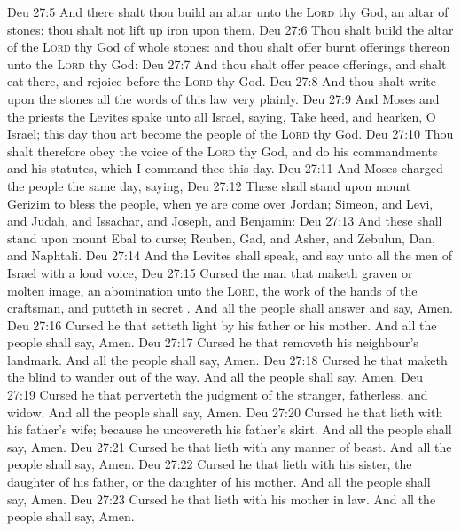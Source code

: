 \vs Deu 27:5 And there shalt thou build an altar unto the \textsc{Lord} thy God, an altar of stones: thou shalt not lift up  iron  upon them.
\vs Deu 27:6 Thou shalt build the altar of the \textsc{Lord} thy God of whole stones: and thou shalt offer burnt offerings thereon unto the \textsc{Lord} thy God:
\vs Deu 27:7 And thou shalt offer peace offerings, and shalt eat there, and rejoice before the \textsc{Lord} thy God.
\vs Deu 27:8 And thou shalt write upon the stones all the words of this law very plainly.
\vs Deu 27:9 And Moses and the priests the Levites spake unto all Israel, saying, Take heed, and hearken, O Israel; this day thou art become the people of the \textsc{Lord} thy God.
\vs Deu 27:10 Thou shalt therefore obey the voice of the \textsc{Lord} thy God, and do his commandments and his statutes, which I command thee this day.
\vs Deu 27:11 And Moses charged the people the same day, saying,
\vs Deu 27:12 These shall stand upon mount Gerizim to bless the people, when ye are come over Jordan; Simeon, and Levi, and Judah, and Issachar, and Joseph, and Benjamin:
\vs Deu 27:13 And these shall stand upon mount Ebal to curse; Reuben, Gad, and Asher, and Zebulun, Dan, and Naphtali.
\vs Deu 27:14 And the Levites shall speak, and say unto all the men of Israel with a loud voice,
\vs Deu 27:15 Cursed  the man that maketh  graven or molten image, an abomination unto the \textsc{Lord}, the work of the hands of the craftsman, and putteth  in  secret . And all the people shall answer and say, Amen.
\vs Deu 27:16 Cursed  he that setteth light by his father or his mother. And all the people shall say, Amen.
\vs Deu 27:17 Cursed  he that removeth his neighbour's landmark. And all the people shall say, Amen.
\vs Deu 27:18 Cursed  he that maketh the blind to wander out of the way. And all the people shall say, Amen.
\vs Deu 27:19 Cursed  he that perverteth the judgment of the stranger, fatherless, and widow. And all the people shall say, Amen.
\vs Deu 27:20 Cursed  he that lieth with his father's wife; because he uncovereth his father's skirt. And all the people shall say, Amen.
\vs Deu 27:21 Cursed  he that lieth with any manner of beast. And all the people shall say, Amen.
\vs Deu 27:22 Cursed  he that lieth with his sister, the daughter of his father, or the daughter of his mother. And all the people shall say, Amen.
\vs Deu 27:23 Cursed  he that lieth with his mother in law. And all the people shall say, Amen.
